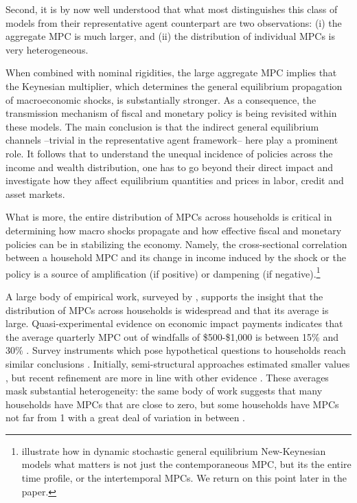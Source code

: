 Second, it is by now well understood that what most distinguishes this class of models from their representative agent counterpart are two observations: (i) the aggregate MPC is much larger, and (ii) the distribution of individual MPCs is very heterogeneous. 

When combined with nominal rigidities, the large aggregate MPC implies that the Keynesian multiplier, which determines the general equilibrium propagation of macroeconomic shocks, is substantially stronger. As a consequence, the transmission mechanism of fiscal and monetary policy is being revisited within these models. The main conclusion is that the indirect general equilibrium channels --trivial in the representative agent framework-- here play a prominent role. It follows that to understand the unequal incidence of policies across the income and wealth distribution, one has to go beyond their direct impact and investigate how they affect equilibrium quantities and prices in labor, credit and asset markets.

What is more, the entire distribution of MPCs across households is critical in determining how macro shocks propagate and how effective fiscal and monetary policies can be in stabilizing the economy. Namely, the cross-sectional correlation between a household MPC and its change in income induced by the shock or the policy is a source of amplification (if positive) or dampening (if negative).\footnote{\citet{auclert2018intertemporal} illustrate how in dynamic stochastic general equilibrium New-Keynesian models what matters is not just the contemporaneous MPC, but its the entire time profile, or the intertemporal MPCs. We return on this point later in the paper.} 

A large body of empirical work, surveyed by \citet{jappelli2010consumption}, supports the insight that the distribution of MPCs across households is widespread and that its average is large. Quasi-experimental evidence on economic impact payments indicates that the average quarterly MPC out of windfalls of \$500-\$1,000 is between 15\% and 30\% \citep{johnson2006household,parker2013consumer}. Survey instruments which pose hypothetical questions to households reach similar conclusions \citep{fuster2021would,parker2019reported}. Initially, semi-structural approaches estimated smaller values \citep{blundell2008consumption}, but recent refinement are more in line with other evidence \citep{commault2017does,ganong2020wealth}. These averages mask substantial heterogeneity: the same body of work suggests that many households have MPCs that are close to zero, but some households have MPCs not far from 1 with a great deal of variation in between \citep{gelman2021drives,lewis2019latent}.

